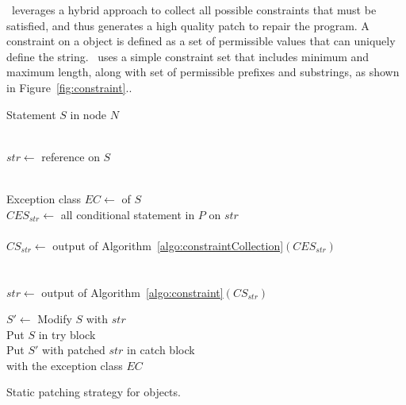  \tool\ leverages a hybrid
approach to collect all possible constraints that must be satisfied, and thus
generates a high quality patch to repair the program. A constraint on a
 object is defined as a set of permissible values that can uniquely
define the string. \tool\ uses a simple constraint set that includes minimum and maximum
length, along with set of permissible prefixes and substrings, as shown in
Figure~\ref{fig:constraint}..

\begin{algorithm}[t]
\scriptsize
\DontPrintSemicolon
{}
\Begin
{
  {
  Statement $S$ in node $N$\\
   {\\
  	\mytab $str \longleftarrow$  reference on $S$
  	
  	 {\\
  	  \mytab Exception class $EC \longleftarrow$  of
$S$\\
          \mytab $CES_{str} \longleftarrow$ all conditional statement in $P$ on
$str$\\
 \mytab  {}\\
  	  \mytab $CS_{str} \longleftarrow$ output of
Algorithm~\ref{algo:constraintCollection}$(CES_{str})$\\

  		\mytab {} {\\
  		
  		 \mytab  {}\\
  			\mytab \mytab $str \longleftarrow$ output of
Algorithm~\ref{algo:constraint}$(CS_{str})$
  		}
  		
  		\mytab {}
  		
  		
  		\mytab $S'\longleftarrow$ Modify $S$ with $str$ \\
  		\mytab Put $S$ in try block\\
  		\mytab Put $S'$ with patched $str$ in catch block \\
  		\mytab with the exception class $EC$	
    }
    \vspace{-2em}
  }
 }
}
\caption{Static patching strategy for  objects.}
\label{algo:patchingStrategy}
\end{algorithm}

